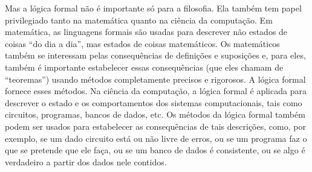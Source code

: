 Mas a lógica formal não é importante só para a filosofia.
Ela também tem papel privilegiado tanto na matemática quanto na ciência da computação.
Em matemática, as linguagens formais são usadas para descrever não estados de coisas ``do dia a dia'', mas estados de coisas matemáticos.
Os matemáticos também se interessam pelas consequências de definições e suposições e, para eles, também é importante estabelecer essas consequências (que eles chamam de ``teoremas'') usando métodos completamente precisos e rigorosos.
A lógica formal fornece esses métodos.
Na ciência da computação, a lógica formal é aplicada para descrever o estado e os comportamentos dos sistemas computacionais, tais como circuitos, programas, bancos de dados, etc.
Os métodos da lógica formal também podem ser usados para estabelecer as consequências de tais descrições, como, por exemplo, se um dado circuito está ou não livre de erros, ou se um programa faz o que se pretende que ele faça, ou se um banco de dados é consistente, ou se algo é verdadeiro a partir dos dados nele contidos.

